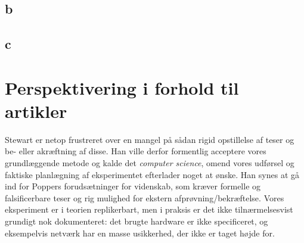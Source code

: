 \documentclass{article}
\begin{document}
\subsection{b}

\subsection{c}

\section{Perspektivering i forhold til artikler}

Stewart er netop frustreret over en mangel på sådan rigid opstillelse af teser og be- eller akræftning af disse. Han ville derfor formentlig acceptere vores grundlæggende metode og kalde det \textit{computer science}, omend vores udførsel og faktiske planlægning af eksperimentet efterlader noget at ønske. Han synes at gå ind for Poppers forudsætninger for videnskab, som kræver formelle og falsificerbare teser og rig mulighed for ekstern afprøvning/bekræftelse. Vores eksperiment er i teorien replikerbart, men i praksis er det ikke tilnærmelsesvist grundigt nok dokumenteret: det brugte hardware er ikke specificeret, og eksempelvis netværk har en masse usikkerhed, der ikke er taget højde for.   
\end{document}
